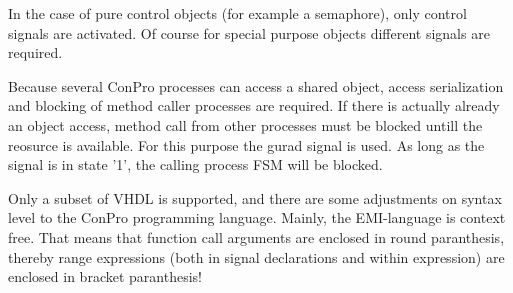 \documentclass[a4paper,12pt,twoside,english]{article}
\begin{document}
\begin{description}
\begin{description}
\end{description}
In the case of pure control objects (for example a semaphore), only control signals are activated. Of course for special purpose objects different signals are
required. 

Because several ConPro processes can access a shared object, access serialization and blocking of method caller processes are required. If there is actually
already an object access, method call from other processes must be blocked untill the reosurce is available. For this purpose the gurad signal is used. As long
as the signal is in state '1', the calling process FSM will be blocked. 


\item[\colorit{\bf Warning and Limitations}] $ $\\
Only a subset of VHDL is supported, and there are some adjustments on syntax level to the ConPro programming language. Mainly, the EMI-language is context free.
That means that function call arguments are enclosed in round paranthesis, thereby range expressions (both in signal declarations and within expression) are
enclosed in bracket paranthesis!


\end{description}
\end{document}
